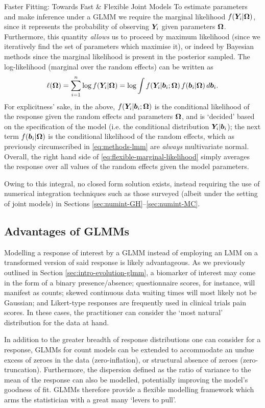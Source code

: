 \begin{chapter}{\label{cha:flexible}Faster Fitting: Towards Fast \& Flexible Joint Models}
 To estimate parameters and make inference under a GLMM we require the marginal likelihood $f\!\left(\bm{Y}_i|\bm{\mathrm{\Omega}}\right)$, since it represents the probability of observing $\bm{Y}_i$ given parameters $\bm{\mathrm{\Omega}}$. Furthermore, this quantity \textit{allows} us to proceed by maximum likelihood (\ie since we iteratively find the set of parameters which maximise it), or indeed by Bayesian methods since the marginal likelihood is present in the posterior sampled. The log-likelihood (marginal over the random effects) can be written as
 \begin{equation}
     \ell(\bm{\mathrm{\Omega}})=\sum_{i=1}^n\log f\!\left(\bm{Y}_i|\bm{\mathrm{\Omega}}\right) = \log\int f\!\left(\bm{Y}_i|\bm{b}_i;\bm{\mathrm{\Omega}}\right) f\!\left(\bm{b}_i|\bm{\mathrm{\Omega}}\right) d\bm{b}_i.
 \label{eq:flexible-marginal-likelihood}
 \end{equation}
 For explicitness' sake, in the above, $f\!\left(\bm{Y}_i|\bm{b}_i;\bm{\mathrm{\Omega}}\right)$ is the conditional likelihood of the response given the random effects and parameters $\bm{\mathrm{\Omega}}$, and is `decided' based on the specification of the model (i.e. the conditional distribution $\bm{Y}_i|\bm{b}_i$); the next term $f\!\left(\bm{b}_i|\bm{\mathrm{\Omega}}\right)$ is the conditional likelihood of the random effects, which as previously circumscribed in \eqref{eq:methods-lmm} are \textit{always}  multivariate normal. Overall, the right hand side of \eqref{eq:flexible-marginal-likelihood} simply averages the response over all values of the random effects given the model parameters. 
 
Owing to this integral, no closed form solution exists, instead requiring the use of numerical integration techniques such as those surveyed (albeit under the setting of joint models) in Sections \ref{sec:numint-GH}--\ref{sec:numint-MC}.

\subsection{Advantages of GLMMs}\label{sec:flexible-glmm-advantages}
Modelling a response of interest by a GLMM instead of employing an LMM on a transformed version of said response is likely advantageous. As we previously outlined in Section \ref{sec:intro-evolution-glmm}, a biomarker of interest may come in the form of a binary presence/absence; questionnaire scores, for instance, will manifest as counts; skewed continuous data \eg waiting times will most likely not be Gaussian; and Likert-type responses are frequently used in clinical trials \eg pain scores. In these cases, the practitioner can consider the `most natural' distribution for the data at hand. 

In addition to the greater breadth of response distributions one can consider for a response, GLMMs for count models can be extended to accommodate an undue excess of zeroes in the data (zero-inflation), or structural absence of zeroes (zero-truncation). Furthermore, the dispersion defined as the ratio of variance to the mean of the response can also be modelled, potentially improving the model's goodness of fit. GLMMs therefore provide a flexible modelling framework which arms the statistician with a great many `levers to pull'. 


\end{chapter}

